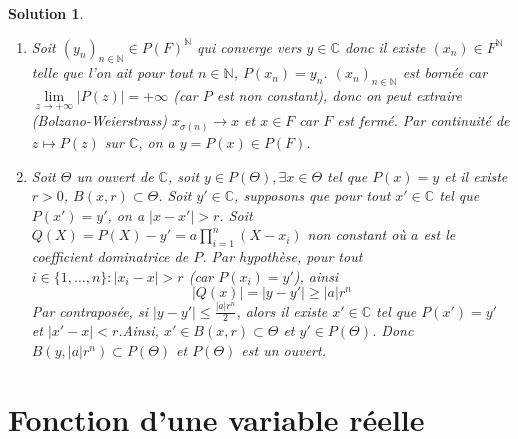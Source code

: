 \documentclass[12pt]{article}
\newtheorem{solution}{Solution}[section]
\theoremstyle{remark}
\newcommand{\C}{\mathbb{C}} \newcommand{\Q}{\mathbb{Q}}
\newcommand{\N}{\mathbb{N}} \newcommand{\Z}{\mathbb{Z}}
\begin{document}
\begin{solution}
	\phantom{}
	\begin{enumerate}
		\item Soit $(y_{n})_{n\in\N}\in P(F)^{\N}$ qui converge vers $y\in\C$ donc il existe $(x_{n})\in F^{\N}$ telle que l'on ait pour tout $n\in\N$, $P(x_{n})=y_{n}$. $(x_{n})_{n\in\N}$ est bornée car $\lim\limits_{z\to+\infty}\vert P(z)\vert=+\infty$ (car $P$ est non constant), donc on peut extraire (Bolzano-Weierstrass) $x_{\sigma(n)}\to x$ et $x\in F$ car $F$ est fermé. Par continuité de $z\mapsto P(z)$ sur $\C$, on a $y=P(x)\in P(F)$.
		
		\item Soit $\Theta$ un ouvert de $\C$, soit $y\in P(\Theta),\exists x\in\Theta$ tel que $P(x)=y$ et il existe $r>0$, $B(x,r)\subset\Theta$. Soit $y'\in\C$, supposons que pour tout $x'\in\C$ tel que $P(x')=y'$, on a $\vert x-x'\vert>r$. Soit $Q(X)=P(X)-y'=a\prod_{i=1}^{n}(X-x_{i})$ non constant où $a$ est le coefficient dominatrice de $P$. Par hypothèse, pour tout $i\in\{1,\dots,n\}\colon\vert x_{i}-x\vert>r$ (car $P(x_{i})=y'$), ainsi 
		$$\vert Q(x)\vert=\vert y-y'\vert\geqslant\vert a\vert r^{n}$$
		Par contraposée, si $\vert y-y'\vert\leqslant\frac{\vert a\vert r^{n}}{2}$, alors il existe $x'\in\C$ tel que $P(x')=y'$ et $\vert x'-x\vert<r$.Ainsi, $x'\in B(x,r)\subset\Theta$ et $y'\in P(\Theta)$. Donc $B(y,\vert a\vert r^{n})\subset P(\Theta)$ et $P(\Theta)$ est un ouvert.
	\end{enumerate}
\end{solution}

\cleardoublepage
\section{Fonction d'une variable réelle}
\end{document}
